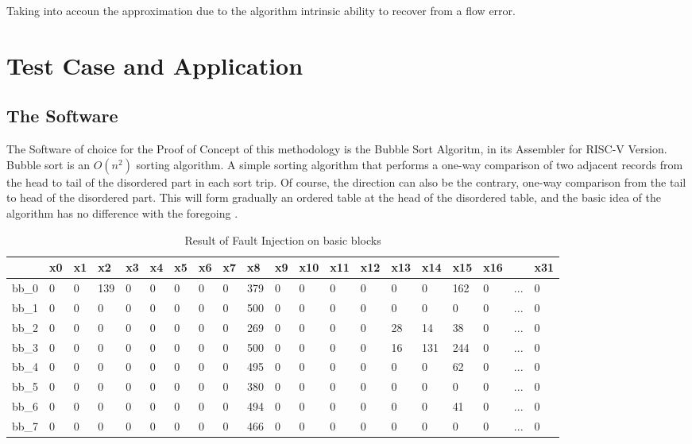 \documentclass[./dissertation.tex]{subfiles}
\begin{document}
Taking into accoun the approximation due to the algorithm intrinsic ability to recover from a flow error.

%
%

\section{Test Case and Application}
\label{sec:testcase}
\subsection{The Software}
The Software of choice for the Proof of Concept of this methodology is the Bubble Sort Algoritm, in its Assembler for RISC-V Version. Bubble sort is an $O(n^2)$ sorting algorithm. A simple sorting algorithm that performs a one-way comparison of two adjacent records from the head to tail of the disordered part in each sort trip. Of course, the direction can also be the contrary, one-way comparison from the tail to head of the disordered part. This will form gradually an ordered table at the head of the disordered table, and the basic idea of the algorithm has no difference with the foregoing \cite{5635119}.
\begin{table*}[!ht]
    \centering
    \caption{Result of Fault Injection on basic blocks}
    \begin{tabular}{|l|l|l|l|l|l|l|l|l|l|l|l|l|l|l|l|l|l|l|l|}
    \hline
        ~ & x0 & x1 & x2 & x3 & x4 & x5 & x6 & x7 & x8 & x9 & x10 & x11 & x12 & x13 & x14 & x15 & x16 & ~ & x31 \\ \hline
        bb\_0 & 0 & 0 & 139 & 0 & 0 & 0 & 0 & 0 & 379 & 0 & 0 & 0 & 0 & 0 & 0 & 162 & 0 & ... & 0 \\ \hline
        bb\_1 & 0 & 0 & 0 & 0 & 0 & 0 & 0 & 0 & 500 & 0 & 0 & 0 & 0 & 0 & 0 & 0 & 0 & ... & 0 \\ \hline
        bb\_2 & 0 & 0 & 0 & 0 & 0 & 0 & 0 & 0 & 269 & 0 & 0 & 0 & 0 & 28 & 14 & 38 & 0 & ... & 0 \\ \hline
        bb\_3 & 0 & 0 & 0 & 0 & 0 & 0 & 0 & 0 & 500 & 0 & 0 & 0 & 0 & 16 & 131 & 244 & 0 & ... & 0 \\ \hline
        bb\_4 & 0 & 0 & 0 & 0 & 0 & 0 & 0 & 0 & 495 & 0 & 0 & 0 & 0 & 0 & 0 & 62 & 0 & ... & 0 \\ \hline
        bb\_5 & 0 & 0 & 0 & 0 & 0 & 0 & 0 & 0 & 380 & 0 & 0 & 0 & 0 & 0 & 0 & 0 & 0 & ... & 0 \\ \hline
        bb\_6 & 0 & 0 & 0 & 0 & 0 & 0 & 0 & 0 & 494 & 0 & 0 & 0 & 0 & 0 & 0 & 41 & 0 & ... & 0 \\ \hline
        bb\_7 & 0 & 0 & 0 & 0 & 0 & 0 & 0 & 0 & 466 & 0 & 0 & 0 & 0 & 0 & 0 & 0 & 0 & ... & 0 \\ \hline
    \end{tabular}
\end{table*}
\end{document}
